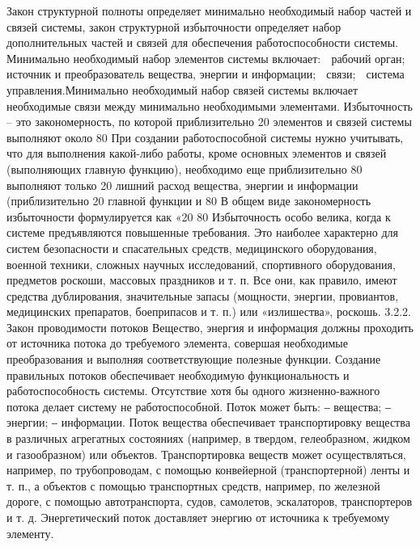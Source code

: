 \documentclass[11pt,a4paper]{article}
\begin{document}
\begin{itemize}
Закон структурной полноты определяет минимально необходимый набор частей и
связей системы, закон структурной избыточности определяет набор дополнительных
частей и связей для обеспечения работоспособности системы.
Минимально необходимый набор элементов системы включает:

рабочий орган;

источник и преобразователь вещества, энергии и информации;

связи;

система управления.Минимально необходимый набор связей системы включает необходимые связи
между минимально необходимыми элементами.
Избыточность – это закономерность, по которой приблизительно 20%
элементов и связей системы выполняют около 80%
При создании работоспособной системы нужно учитывать, что для выполнения
какой-либо работы, кроме основных элементов и связей (выполняющих главную функцию),
необходимо еще приблизительно 80%
выполняют только 20%
лишний расход вещества, энергии и информации (приблизительно 20%
главной функции и 80%
В общем виде закономерность избыточности формулируется как «20%
80%
Избыточность особо велика, когда к системе предъявляются повышенные требования.
Это наиболее характерно для систем безопасности и спасательных средств,
медицинского оборудования, военной техники, сложных научных исследований,
спортивного оборудования, предметов роскоши, массовых праздников и т. п. Все они, как
правило, имеют средства дублирования, значительные запасы (мощности, энергии,
провиантов, медицинских препаратов, боеприпасов и т. п.) или «излишества», роскошь.
3.2.2. Закон проводимости потоков
Вещество, энергия и информация должны проходить от источника потока до
требуемого элемента, совершая необходимые преобразования и выполняя
соответствующие полезные функции.
Создание правильных потоков обеспечивает необходимую функциональность и
работоспособность системы. Отсутствие хотя бы одного жизненно-важного потока
делает систему не работоспособной.
Поток может быть:
‒ вещества;
‒ энергии;
‒ информации.
Поток вещества обеспечивает транспортировку вещества в различных агрегатных
состояниях (например, в твердом, гелеобразном, жидком и газообразном) или объектов.
Транспортировка веществ может осуществляться, например, по трубопроводам, с
помощью конвейерной (транспортерной) ленты и т. п., а объектов с помощью
транспортных средств, например, по железной дороге, с помощью автотранспорта, судов,
самолетов, эскалаторов, транспортеров и т. д.
Энергетический поток доставляет энергию от источника к требуемому элементу.

\end{itemize}
\end{document}
